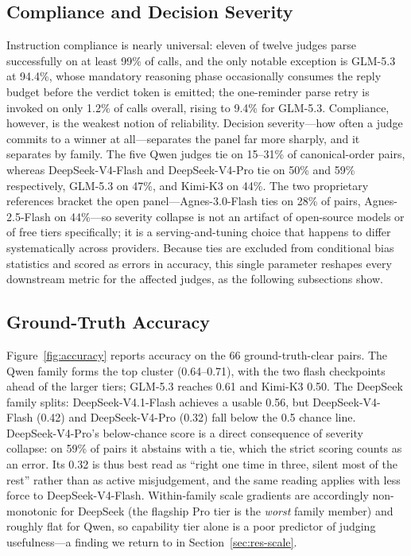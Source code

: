 \documentclass[review,12pt]{elsarticle}
\begin{document}
\subsection{Compliance and Decision Severity}
\label{sec:res-compliance}

Instruction compliance is nearly universal: eleven of twelve judges parse
successfully on at least 99\% of calls, and the only notable exception is
GLM-5.3 at 94.4\%, whose mandatory reasoning phase occasionally consumes the
reply budget before the verdict token is emitted; the one-reminder parse
retry is invoked on only 1.2\% of calls overall, rising to 9.4\% for
GLM-5.3. Compliance, however, is
the weakest notion of reliability. Decision severity---how often a judge
commits to a winner at all---separates the panel far more sharply, and it
separates by family. The five Qwen judges tie on 15--31\% of canonical-order
pairs, whereas DeepSeek-V4-Flash and DeepSeek-V4-Pro tie on 50\% and 59\%
respectively, GLM-5.3 on 47\%, and Kimi-K3 on 44\%. The two proprietary
references bracket the open panel---Agnes-3.0-Flash ties on 28\% of pairs,
Agnes-2.5-Flash on 44\%---so severity collapse is not an artifact of
open-source models or of free tiers specifically; it is a
serving-and-tuning choice that happens to differ systematically across
providers. Because ties are excluded from conditional bias statistics and
scored as errors in accuracy, this single parameter reshapes every downstream
metric for the affected judges, as the following subsections show.

\subsection{Ground-Truth Accuracy}
\label{sec:res-acc}

Figure~\ref{fig:accuracy} reports accuracy on the 66 ground-truth-clear
pairs. The Qwen family forms the top cluster (0.64--0.71), with the two
flash checkpoints ahead of the larger tiers; GLM-5.3 reaches 0.61 and
Kimi-K3 0.50. The DeepSeek family splits: DeepSeek-V4.1-Flash achieves a
usable 0.56, but DeepSeek-V4-Flash (0.42) and DeepSeek-V4-Pro (0.32) fall
below the 0.5 chance line. DeepSeek-V4-Pro's below-chance score is a direct
consequence of severity collapse: on 59\% of pairs it abstains with a tie,
which the strict scoring counts as an error. Its 0.32 is thus best read as
``right one time in three, silent most of the rest'' rather than as active
misjudgement, and the same reading applies with less force to
DeepSeek-V4-Flash. Within-family scale gradients are accordingly
non-monotonic for DeepSeek (the flagship Pro tier is the \emph{worst} family
member) and roughly flat for Qwen, so capability tier alone is a poor
predictor of judging usefulness---a finding we return to in
Section~\ref{sec:res-scale}.
\end{document}
